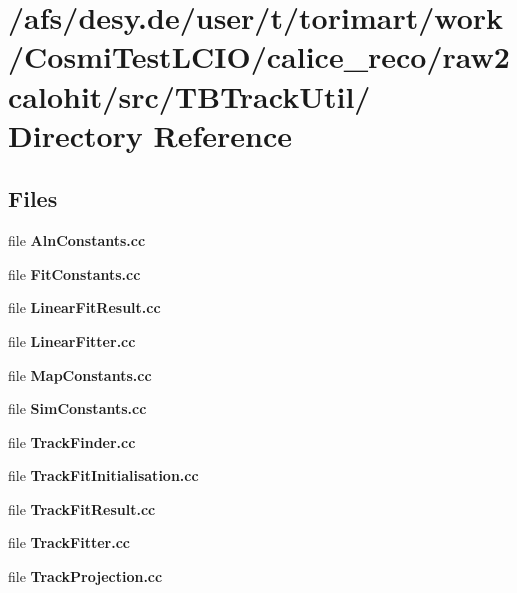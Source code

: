 \section{/afs/desy.de/user/t/torimart/work/CosmiTestLCIO/calice\_\-reco/raw2calohit/src/TBTrackUtil/ Directory Reference}
\label{dir_51cf3b2af9fc9f00ddfebf53aecf979a}
\subsection*{Files}
\begin{DoxyCompactItemize}
\item 
file {\bfseries AlnConstants.cc}
\item 
file {\bfseries FitConstants.cc}
\item 
file {\bfseries LinearFitResult.cc}
\item 
file {\bfseries LinearFitter.cc}
\item 
file {\bfseries MapConstants.cc}
\item 
file {\bfseries SimConstants.cc}
\item 
file {\bfseries TrackFinder.cc}
\item 
file {\bfseries TrackFitInitialisation.cc}
\item 
file {\bfseries TrackFitResult.cc}
\item 
file {\bfseries TrackFitter.cc}
\item 
file {\bfseries TrackProjection.cc}
\end{DoxyCompactItemize}
